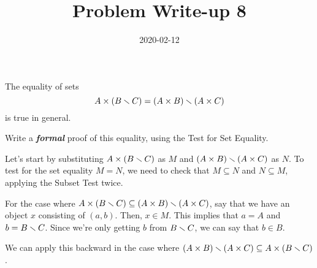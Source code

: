 \documentclass[a4paper,12pt]{article}
\title{Problem Write-up 8}
\date{2020-02-12}
\begin{document}
	\begin{problem}
		The equality of sets \[A \times (B \smallsetminus C) = (A \times B) \smallsetminus (A \times C)\] is true in general.
		
		Write a \textbf{\textit{formal}} proof of this equality, using the Test for Set Equality.	
	\end{problem}
	\begin{answer}
		Let's start by substituting \(A \times (B \smallsetminus C)\) as \(M\) and \((A \times B) \smallsetminus (A \times C)\) as \(N\). To test for the set equality \(M = N\), we need to check that \(M \subseteq N\) and \(N \subseteq M\), applying the Subset Test twice. 

		For the case where \(A \times (B \smallsetminus C) \subseteq (A \times B) \smallsetminus (A \times C)\), say that we have an object \(x\) consisting of \((a,b)\). Then, \(x \in M\). This implies that \(a = A\) and \(b = B \smallsetminus C\). Since we're only getting \(b\) from \(B \smallsetminus C\), we can say that \(b \in B\).

		We can apply this backward in the case where \((A \times B) \smallsetminus (A \times C) \subseteq A \times (B \smallsetminus C)\).
	\end{answer}
\end{document}
